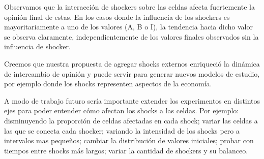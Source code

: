 
Observamos que la interacción de shockers sobre las celdas afecta fuertemente la opinión
final de estas. 
En los casos donde la influencia de los shockers es mayoritariamente a uno de los valores (A, B o I), la
tendencia hacia dicho valor se observa claramente, independientemente de los valores finales observados sin la influencia de shocker.

Creemos que nuestra propuesta de agregar shocks externos enriqueció la dinámica de
intercambio de opinión y puede servir para generar nuevos modelos de estudio, por ejemplo donde los shocks representen aspectos de la economía.

A modo de trabajo futuro sería importante extender los experimentos en
distintos ejes para poder entender cómo afectan los shocks a las celdas. Por
ejemplo: disminuyendo la proporción de celdas afectadas en cada shock; variar las celdas a las que se conecta cada shocker; variando la 
intensidad de los shocks pero a intervalos mas pequeños;
cambiar la distribución de valores iniciales; probar con tiempos entre shocks
más largos; variar la cantidad de shockers y su balanceo.


